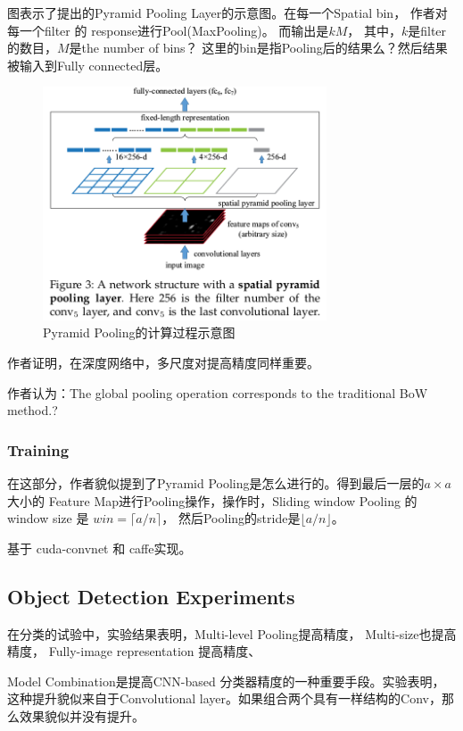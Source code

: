 图表示了提出的Pyramid Pooling Layer的示意图。在每一个Spatial bin， 作者对每一个filter 的 response进行Pool(MaxPooling)。 而输出是$kM$， 其中，$k$是filter的数目，$M$是the number of bins？ 这里的bin是指Pooling后的结果么？然后结果被输入到Fully connected层。

\begin{figure}[!hbtp]
\centering
\includegraphics[width=0.75\textwidth]{FeatureExtraction/SPPNet1.png}
\caption{Pyramid Pooling的计算过程示意图}
\label{SPPNet1}
\end{figure}

作者证明，在深度网络中，多尺度对提高精度同样重要。

作者认为：The global pooling operation corresponds to the traditional BoW method.?

\subsubsection{Training}

在这部分，作者貌似提到了Pyramid Pooling是怎么进行的。得到最后一层的$a \times a$ 大小的 Feature Map进行Pooling操作，操作时，Sliding window Pooling 的 window size 是 $win = \lceil a / n \rceil$， 然后Pooling的stride是$\lfloor a / n \rfloor$。

基于 cuda-convnet 和 caffe实现。

\subsection{Object Detection Experiments}

在分类的试验中，实验结果表明，Multi-level Pooling提高精度， Multi-size也提高精度， Fully-image representation 提高精度、

Model Combination是提高CNN-based 分类器精度的一种重要手段。实验表明，这种提升貌似来自于Convolutional layer。如果组合两个具有一样结构的Conv，那么效果貌似并没有提升。

